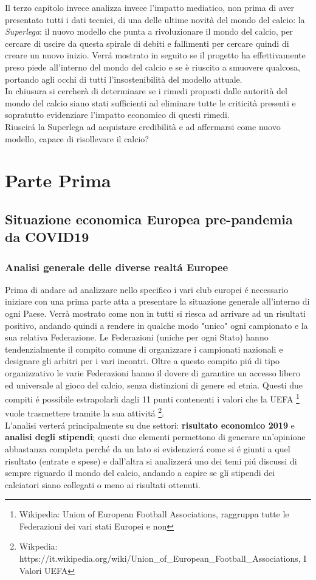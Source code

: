 \documentclass[
    corpo=11.5pt,
    oneside,
    evenboxes,
    tipotesi=triennale,
    stile=classica,
    oldstyle,
    autoretitolo,
    greek,
]{toptesi}
\begin{document}
\begin{interlinea}{1.5}
Il terzo capitolo invece analizza invece l'impatto mediatico, non prima di aver presentato tutti i dati tecnici, di una delle ultime novità 
del mondo del calcio: la \emph{Superlega}: il nuovo modello che punta a rivoluzionare il mondo del calcio, per cercare di uscire da questa spirale di debiti
e fallimenti per cercare quindi di creare un nuovo inizio. Verr\'a mostrato in seguito se il progetto ha effettivamente preso piede all'interno del mondo del calcio 
e se è riuscito a smuovere qualcosa, portando agli occhi di tutti l'insostenibilità del modello attuale.\\
In chiusura si cercherà di determinare se i rimedi proposti dalle autorità del mondo del calcio siano stati sufficienti ad eliminare tutte le criticità presenti e 
sopratutto evidenziare l'impatto economico di questi rimedi.\\
Riuscir\'a la Superlega ad acquistare credibilità e ad affermarsi come nuovo modello, capace di risollevare il calcio?

\part{Parte Prima}
\chapter{Situazione economica Europea pre-pandemia da COVID19}
\section{Analisi generale delle diverse realt\'a Europee}
Prima di andare ad analizzare nello specifico i vari club europei \'e necessario iniziare con una prima 
parte atta a presentare la situazione generale all'interno di ogni Paese. Verrà mostrato come non in tutti 
si riesca ad arrivare ad un risultati positivo, andando quindi a rendere in qualche modo 
"unico" ogni campionato e la sua relativa Federazione. Le Federazioni (uniche per ogni Stato) hanno tendenzialmente il compito
comune di organizzare i campionati nazionali e designare gli arbitri per i vari incontri. Oltre a questo compito pi\'u di tipo
organizzativo le varie Federazioni hanno il dovere di garantire un accesso libero ed universale al gioco del calcio, senza distinzioni
di genere ed etnia. Questi due compiti \'e possibile estrapolarli dagli 11 punti contenenti i valori che la UEFA 
\footnote{Wikipedia: Union of European Football Associations, raggruppa tutte le Federazioni dei vari stati Europei e non} vuole
trasmettere tramite la sua attivit\'a \footnote{Wikpedia: https://it.wikipedia.org/wiki/Union\_of\_European\_Football\_Associations, I Valori UEFA}.\\
L'analisi verter\'a principalmente su due settori: \textbf{risultato economico 2019} e \textbf{analisi degli stipendi}; questi due elementi
permettono di generare un'opinione abbastanza completa perch\'e da un lato si evidenzier\'a come si \'e giunti a quel risultato (entrate e spese)
e dall'altra si analizzer\'a uno dei temi pi\'u discussi di sempre riguardo il mondo del calcio, andando a capire se gli stipendi dei calciatori
siano collegati o meno ai risultati ottenuti.


\end{interlinea}
\end{document}
